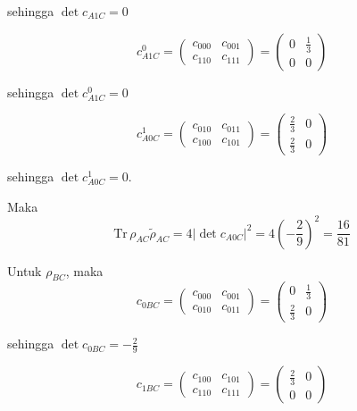 sehingga $\det c_{A1C} = 0$

\begin{equation}
	c_{A1C}^0=
	\begin{pmatrix}
		c_{000} & c_{001} \\
		c_{110} & c_{111}
	\end{pmatrix}=
	\begin{pmatrix}
		0 & \frac{1}{3} \\
		0 & 0
	\end{pmatrix}
\end{equation}

sehingga $\det c_{A1C}^0 = 0$

\begin{equation}
	c_{A0C}^1=
	\begin{pmatrix}
		c_{010} & c_{011} \\
		c_{100} & c_{101}
	\end{pmatrix}=
	\begin{pmatrix}
		\frac{2}{3} & 0 \\
		\frac{2}{3} & 0
	\end{pmatrix}
\end{equation}

sehingga $\det c_{A0C}^1 = 0$.

Maka
\begin{equation}
	\mathrm{Tr}\,\rho_{AC}\tilde{\rho}_{AC}=4|\det c_{A0C}|^2=4(-\frac{2}{9})^2=\frac{16}{81}
\end{equation}

Untuk $\rho_{BC}$, maka
\begin{equation}
	c_{0BC}=
	\begin{pmatrix}
		c_{000} & c_{001} \\
		c_{010} & c_{011}
	\end{pmatrix}=
	\begin{pmatrix}
		0 & \frac{1}{3} \\
		\frac{2}{3} & 0
	\end{pmatrix}
\end{equation}

sehingga $\det c_{0BC} = -\frac{2}{9}$

\begin{equation}
	c_{1BC}=
	\begin{pmatrix}
		c_{100} & c_{101} \\
		c_{110} & c_{111}
	\end{pmatrix}=
	\begin{pmatrix}
		\frac{2}{3} & 0 \\
		0 & 0
	\end{pmatrix}
\end{equation}

